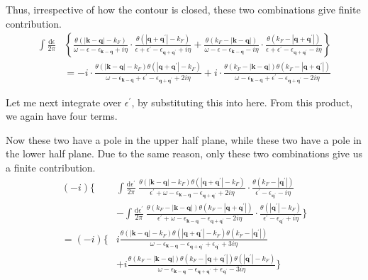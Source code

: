 Thus, irrespective of how the contour is closed, these two combinations give finite contribution.
\[\begin{split} \int \frac{\mathrm{d} \epsilon}{2\pi}
&\left \{ \frac{\theta(|\mathbf{k}-\mathbf{q}|-k_F)}{\omega - \epsilon - \epsilon_{\mathbf{k}-\mathbf{q}} + i \eta} \cdot \frac{ \theta(|\mathbf{q}+\mathbf{q}^{'}|-k_F)}{\epsilon + \epsilon^{'} - \epsilon_{\mathbf{q}+\mathbf{q}^{'}} + i \eta}
+ \frac{\theta(k_F-|\mathbf{k}-\mathbf{q}|)}{\omega - \epsilon - \epsilon_{\mathbf{k}-\mathbf{q}} - i \eta} \cdot \frac{ \theta(k_F-|\mathbf{q}+\mathbf{q}^{'}|)}{\epsilon + \epsilon^{'} - \epsilon_{\mathbf{q}+\mathbf{q}^{'}} - i \eta} \right \}\\
& = -i \cdot \frac{\theta(|\mathbf{k}-\mathbf{q}|-k_F)\theta(|\mathbf{q}+\mathbf{q}^{'}|-k_F)}{\omega - \epsilon_{\mathbf{k}-\mathbf{q}} + \epsilon^{'} - \epsilon_{\mathbf{q}+\mathbf{q}^{'}} + 2 i \eta }
+i \cdot \frac{\theta(k_F-|\mathbf{k}-\mathbf{q}|)\theta(k_F-|\mathbf{q}+\mathbf{q}^{'}|)}{\omega - \epsilon_{\mathbf{k}-\mathbf{q}} + \epsilon^{'} - \epsilon_{\mathbf{q}+\mathbf{q}^{'}} - 2 i \eta }
\end{split} \]

Let me next integrate over $\epsilon^{'}$, by substituting this into here. From this product, we again have four terms.

Now these two have a pole in the upper half plane, while these two have a pole in the lower half plane. Due to the same reason, only these two combinations give us a finite contribution.
\[\begin{split}  (-i) \{
&\int \frac{\mathrm{d}\epsilon^{'}}{2\pi} \  \frac{\theta(|\mathbf{k}-\mathbf{q}|-k_F)\theta(|\mathbf{q}+\mathbf{q}^{'}|-k_F)}{\epsilon^{'} + \omega - \epsilon_{\mathbf{k}-\mathbf{q}} - \epsilon_{\mathbf{q}+\mathbf{q}^{'}} + 2 i \eta }
\cdot \frac{\theta(k_F-|\mathbf{q}^{'}|)}{\epsilon^{'}-\epsilon_{\mathbf{q}^{'}}-i \eta} \\
&- \int \frac{\mathrm{d}\epsilon^{'}}{2\pi} \ \frac{\theta(k_F-|\mathbf{k}-\mathbf{q}|)\theta(k_F-|\mathbf{q}+\mathbf{q}^{'}|)}{\epsilon^{'} + \omega - \epsilon_{\mathbf{k}-\mathbf{q}} - \epsilon_{\mathbf{q}+\mathbf{q}^{'}} - 2 i \eta }
\cdot \frac{\theta(|\mathbf{q}^{'}|-k_F)}{\epsilon^{'}-\epsilon_{\mathbf{q}^{'}}+i \eta} \} \\
=(-i) \{
&i \frac{\theta(|\mathbf{k}-\mathbf{q}|-k_F)\theta(|\mathbf{q}+\mathbf{q}^{'}|-k_F)\theta(k_F-|\mathbf{q}^{'}|)}{\omega - \epsilon_{\mathbf{k}-\mathbf{q}}-\epsilon_{\mathbf{q}+\mathbf{q}^{'}}+\epsilon_{\mathbf{q}^{'}}+3i \eta}\\
&+i \frac{\theta(k_F-|\mathbf{k}-\mathbf{q}|)\theta(k_F-|\mathbf{q}+\mathbf{q}^{'}|)\theta(|\mathbf{q}^{'}|-k_F)}{\omega - \epsilon_{\mathbf{k}-\mathbf{q}}-\epsilon_{\mathbf{q}+\mathbf{q}^{'}}+\epsilon_{\mathbf{q}^{'}}-3i \eta}
\}
 \end{split}\]

